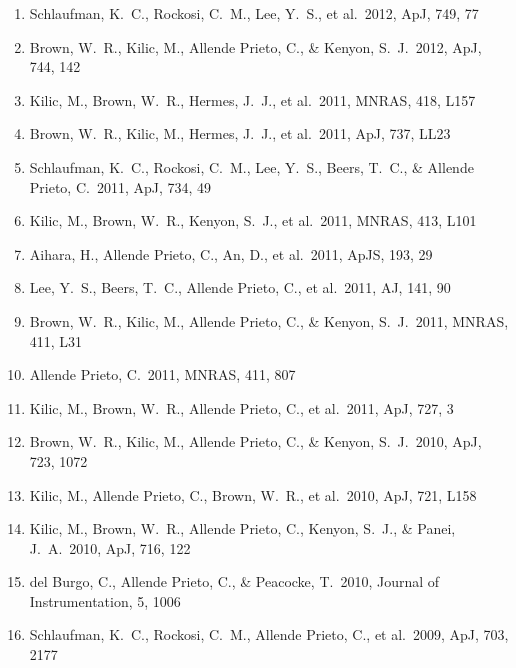 \documentclass[12pt]{article}
\begin{document}
\begin{enumerate}
\item Schlaufman, K.~C., 
Rockosi, C.~M., Lee, Y.~S., et al.\ 2012, ApJ, 749, 77 


\item Brown, W.~R., Kilic, M., 
Allende Prieto, C., \& Kenyon, S.~J.\ 2012, ApJ, 744, 142 


\item Kilic, M., Brown, W.~R., 
Hermes, J.~J., et al.\ 2011, MNRAS, 418, L157 


\item Brown, W.~R., Kilic, M., 
Hermes, J.~J., et al.\ 2011, ApJ, 737, LL23 


\item Schlaufman, K.~C., 
Rockosi, C.~M., Lee, Y.~S., Beers, T.~C., 
\& Allende Prieto, C.\ 2011, ApJ, 734, 49 


\item Kilic, M., Brown, W.~R., 
Kenyon, S.~J., et al.\ 2011, MNRAS, 413, L101 


\item Aihara, H., Allende 
Prieto, C., An, D., et al.\ 2011, ApJS, 193, 29 


\item Lee, Y.~S., Beers, T.~C., 
Allende Prieto, C., et al.\ 2011, AJ, 141, 90 


\item Brown, W.~R., Kilic, M., 
Allende Prieto, C., \& Kenyon, S.~J.\ 2011, MNRAS, 411, L31 


\item Allende Prieto, C.\ 
2011, MNRAS, 411, 807 


\item Kilic, M., Brown, W.~R., 
Allende Prieto, C., et al.\ 2011, ApJ, 727, 3 


\item Brown, W.~R., Kilic, M., 
Allende Prieto, C., \& Kenyon, S.~J.\ 2010, ApJ, 723, 1072 


\item Kilic, M., Allende 
Prieto, C., Brown, W.~R., et al.\ 2010, ApJ, 721, L158 


\item Kilic, M., Brown, W.~R., 
Allende Prieto, C., Kenyon, S.~J., \& Panei, J.~A.\ 2010, ApJ, 716, 122 


\item del Burgo, C., 
Allende Prieto, C., 
\& Peacocke, T.\ 2010, Journal of Instrumentation, 5, 1006 


\item Schlaufman, K.~C., 
Rockosi, C.~M., Allende Prieto, C., et al.\ 2009, ApJ, 703, 2177 



\end{enumerate}
\end{document}
